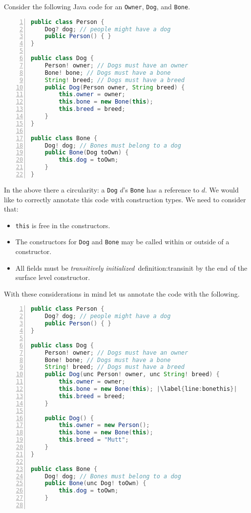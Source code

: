 \documentclass{article}
\begin{document}
\begin{example}
  Consider the following Java code for an \texttt{Owner}, \texttt{Dog}, and \texttt{Bone}.
\begin{lstlisting}[language=Java, escapechar=|, numbers=left]
 public class Person {
    Dog? dog; // people might have a dog
    public Person() { }
}

public class Dog {
    Person! owner; // Dogs must have an owner
    Bone! bone; // Dogs must have a bone
    String! breed; // Dogs must have a breed
    public Dog(Person owner, String breed) {
        this.owner = owner;
        this.bone = new Bone(this);
        this.breed = breed;
    }
}

public class Bone {
    Dog! dog; // Bones must belong to a dog
    public Bone(Dog toOwn) {
        this.dog = toOwn;
    }
}
\end{lstlisting}
  In the above there a circularity: a \texttt{Dog} $d$'s \texttt{Bone} has a reference to $d$.
  We would like to correctly annotate this code with construction types.
  We need to consider that:
  \begin{itemize}
  \item \texttt{this} is free in the constructors.
  \item The constructors for \texttt{Dog} and \texttt{Bone} may be called within or outside of a constructor.
  \item All fields must be \textit{transitively initialized}~{definition:transinit} by the end of the surface level constructor.
  \end{itemize}
  With these considerations in mind let us annotate the code with the following.
\begin{lstlisting}[language=Java, escapechar=|, numbers=left]
 public class Person {
    Dog? dog; // people might have a dog
    public Person() { }
}

public class Dog {
    Person! owner; // Dogs must have an owner
    Bone! bone; // Dogs must have a bone
    String! breed; // Dogs must have a breed
    public Dog(unc Person! owner, unc String! breed) {
        this.owner = owner;
        this.bone = new Bone(this); |\label{line:bonethis}|
        this.breed = breed;
    }

    public Dog() {
        this.owner = new Person();
        this.bone = new Bone(this);
        this.breed = "Mutt";
    }
}

public class Bone {
    Dog! dog; // Bones must belong to a dog
    public Bone(unc Dog! toOwn) {
        this.dog = toOwn;
    }


\end{lstlisting}
\end{example}
\end{document}

